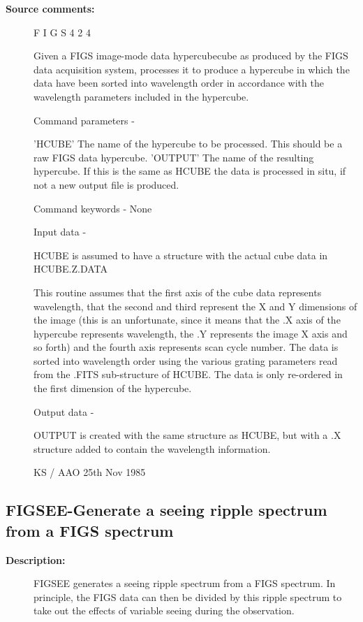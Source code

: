 \begin{description}
\begin{description}
\item [\textbf{Source comments:}]
\begin{terminalv}
 F I G S 4 2 4

 Given a FIGS image-mode data hypercubecube as produced by the FIGS
 data acquisition system, processes it to produce a hypercube in
 which the data have been sorted into wavelength order in accordance
 with the wavelength parameters included in the hypercube.

 Command parameters -

 'HCUBE'    The name of the hypercube to be processed.
            This should be a raw FIGS data hypercube.
 'OUTPUT'   The name of the resulting hypercube.  If this is the
            same as HCUBE the data is processed in situ, if not
            a new output file is produced.

 Command keywords - None

 Input data -

 HCUBE is assumed to have a structure with the actual
 cube data in HCUBE.Z.DATA

 This routine assumes that the first axis of the cube data
 represents wavelength, that the second and third represent the
 X and Y dimensions of the image (this is an unfortunate,
 since it means that the .X axis of the hypercube represents
 wavelength, the .Y represents the image X axis and so forth)
 and the fourth axis represents scan cycle number.
 The data is sorted into wavelength order using the various
 grating parameters read from the .FITS sub-structure of HCUBE.
 The data is only re-ordered in the first dimension of the
 hypercube.

 Output data -

 OUTPUT is created with the same structure as HCUBE, but with
 a .X structure added to contain the wavelength information.

                                 KS / AAO 25th Nov 1985
\end{terminalv}
\end{description}
\subsection{FIGSEE-\label{FIGSEE}Generate a seeing ripple spectrum from a FIGS spectrum}
\begin{description}

\item [\textbf{Description:}]
 FIGSEE generates a seeing ripple spectrum from a FIGS spectrum.
 In principle, the FIGS data can then be divided by this ripple
 spectrum to take out the effects of variable seeing during the
 observation.


\end{description}
\end{description}
